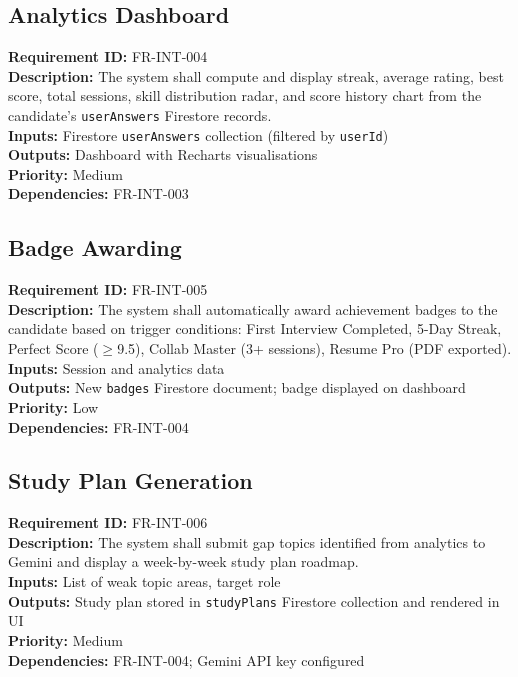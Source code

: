 \documentclass{fisatinternship}
\begin{document}
\vspace{0.4cm}

\subsection{Analytics Dashboard}
\textbf{Requirement ID:} FR-INT-004\\
\textbf{Description:} The system shall compute and display streak, average rating, best
score, total sessions, skill distribution radar, and score history chart from
the candidate's \texttt{userAnswers} Firestore records.\\
\textbf{Inputs:} Firestore \texttt{userAnswers} collection (filtered by \texttt{userId})\\
\textbf{Outputs:} Dashboard with Recharts visualisations\\
\textbf{Priority:} Medium\\
\textbf{Dependencies:} FR-INT-003

\vspace{0.4cm}

\subsection{Badge Awarding}
\textbf{Requirement ID:} FR-INT-005\\
\textbf{Description:} The system shall automatically award achievement badges to the
candidate based on trigger conditions: First Interview Completed, 5-Day Streak, Perfect
Score ($\geq$9.5), Collab Master (3+ sessions), Resume Pro (PDF exported).\\
\textbf{Inputs:} Session and analytics data\\
\textbf{Outputs:} New \texttt{badges} Firestore document; badge displayed on dashboard\\
\textbf{Priority:} Low\\
\textbf{Dependencies:} FR-INT-004

\vspace{0.4cm}

\subsection{Study Plan Generation}
\textbf{Requirement ID:} FR-INT-006\\
\textbf{Description:} The system shall submit gap topics identified from analytics to
Gemini and display a week-by-week study plan roadmap.\\
\textbf{Inputs:} List of weak topic areas, target role\\
\textbf{Outputs:} Study plan stored in \texttt{studyPlans} Firestore collection and rendered in UI\\
\textbf{Priority:} Medium\\
\textbf{Dependencies:} FR-INT-004; Gemini API key configured
\end{document}

